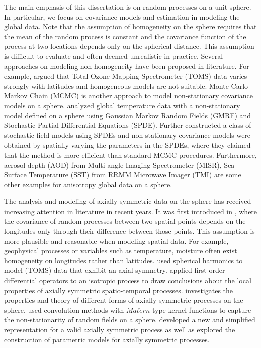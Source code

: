The main emphasis of this dissertation is on random processes on a unit sphere. In particular, we focus on covariance models and estimation in modeling the global data. Note that the assumption of homogeneity on the sphere requires that the mean of the random process is constant and the covariance function of the process at two locations depends only on the spherical distance. This assumption is difficult to evaluate and often deemed unrealistic in practice. Several approaches on modeling non-homogeneity have been proposed in literature. For example, \cite{Stein2007} argued that Total Ozone Mapping Spectrometer (TOMS) data varies strongly with latitudes and homogeneous models are not suitable. Monte Carlo Markov Chain (MCMC) is another approach to model non-stationary covariance models on a sphere. \cite{Lindgren2011} analyzed global temperature data with a non-stationary model defined on a sphere using Gaussian Markov Random Fields (GMRF) and Stochastic Partial Differential Equations (SPDE). Further \cite{BolinLindgren2011} constructed a class of stochastic field models using SPDEs and non-stationary covariance models were obtained by spatially varying the parameters in the SPDEs, where they claimed that the method is more efficient than standard MCMC procedures. Furthermore, aerosol depth (AOD) from Multi-angle Imaging Spectrometer (MISR), Sea Surface Temperature (SST) from RRMM Microwave Imager (TMI) are some other examples for anisotropy global data on a sphere. 

The analysis and modeling of axially symmetric data on the sphere has received increasing attention in literature in recent years. It was first introduced in \cite{Jones1963}, where the covariance of random processes between two spatial points depends on the longitudes only through their difference between those points. This assumption is more plausible and reasonable when modeling spatial data. For example, geophysical processes or variables such as temperature, moisture often exist homogeneity on longitudes rather than latitudes. \cite{Stein2007} used spherical harmonics to model (TOMS) data that exhibit an axial symmetry. \cite{JunStein2008} applied first-order differential operators to an isotropic process to draw conclusions about the local properties of axially symmetric spatio-temporal processes. \cite{HitczenkoStein2012} investigates the properties and theory of different forms of axially symmetric processes on the sphere.  \cite{Li2013} used convolution methods with $Mat\acute{e}rn$-type kernel functions to capture the non-stationarity of random fields on a sphere. \cite{Huang2012} developed a new and simplified representation for a valid axially symmetric process as well as explored the construction of parametric models for axially symmetric processes. 

